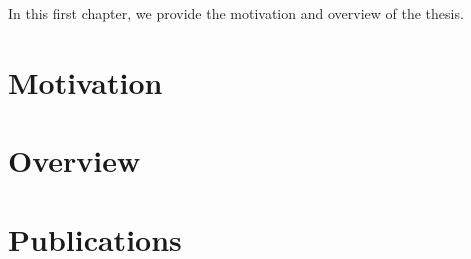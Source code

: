 In this first chapter, we provide the motivation and overview of the thesis.

\section{Motivation}

\section{Overview}

\section{Publications}
